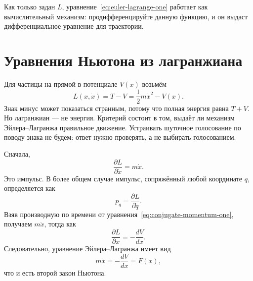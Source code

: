 Как только задан \(L\), уравнение~\eqref{eq:euler-lagrange-one} работает как вычислительный механизм: продифференцируйте данную функцию, и он выдаст дифференциальное уравнение для траектории.

\begin{classroomqa}
\end{classroomqa}

\section{Уравнения Ньютона из лагранжиана}

Для частицы на прямой в потенциале \(V(x)\) возьмём
\begin{equation}
  L(x,\dot x)=T-V
  =\frac12m\dot x^2-V(x).
  \label{eq:lagrangian-tv-one}
\end{equation}
Знак минус может показаться странным, потому что полная энергия равна \(T+V\). Но лагранжиан — не энергия. Критерий состоит в том, выдаёт ли механизм Эйлера--Лагранжа правильное движение. Устраивать шуточное голосование по поводу знака не будем: ответ нужно проверять, а не выбирать голосованием.

Сначала,
\begin{equation}
  \frac{\partial L}{\partial\dot x}=m\dot x.
  \label{eq:conjugate-momentum-one}
\end{equation}
Это импульс. В более общем случае импульс, сопряжённый любой координате \(q\), определяется как
\begin{equation}
  p_q=\frac{\partial L}{\partial\dot q}.
  \label{eq:conjugate-momentum-general}
\end{equation}
Взяв производную по времени от уравнения~\eqref{eq:conjugate-momentum-one}, получаем \(m\ddot x\), тогда как
\begin{equation}
  \frac{\partial L}{\partial x}
  =-\frac{dV}{dx}.
  \label{eq:lagrangian-position-derivative}
\end{equation}
Следовательно, уравнение Эйлера--Лагранжа имеет вид
\begin{equation}
  m\ddot x=-\frac{dV}{dx}=F(x),
  \label{eq:newton-from-action}
\end{equation}
что и есть второй закон Ньютона.

